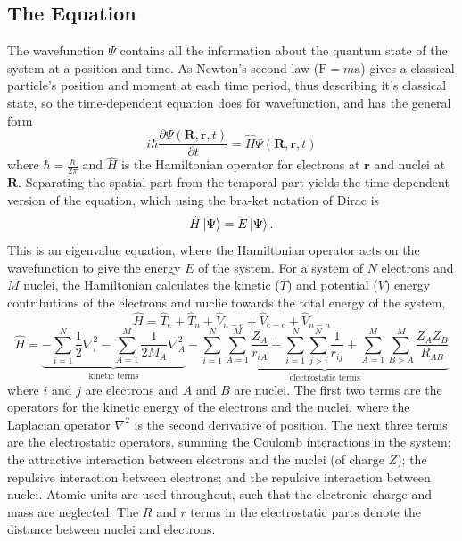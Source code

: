 \subsection{The \schro{} Equation}\label{section: QM_schrodinger}
The wavefunction $\Psi$ contains all the information about the quantum state of the system at a position and time. As Newton's second law ($\bm{\mathrm{F}}=m\bm{\mathrm{a}}$) gives a classical particle's position and moment at each time period, thus describing it's classical state, so the time-dependent \schro{} equation does for wavefunction, and has the general form
\begin{equation}\label{equation: td-schro}
    i\hbar{}\frac{\partial \Psi(\bm{R},\bm{r},t)}{\partial t}=\hat{H}\Psi(\bm{R},\bm{r},t)
\end{equation}
where $\hbar=\frac{h}{2\pi}$ and $\hat{H}$ is the Hamiltonian operator for electrons at $\bm{r}$ and nuclei at $\bm{R}$. Separating the spatial part from the temporal part yields the time-dependent version of the \schro{} equation, which using the bra-ket notation of Dirac is\cite{Schrodinger1926}
\begin{equation}\label{equation: ti-schro}
   \hat{H}\ket{\Psi}=E\ket{\Psi}.
\end{equation}
This is an eigenvalue equation, where the Hamiltonian operator acts on the wavefunction to give the energy $E$ of the system. For a system of $N$ electrons and $M$ nuclei, the Hamiltonian calculates the kinetic ($T$) and potential ($V$) energy contributions of the electrons and nuclie towards the total energy of the system,
\begin{equation}\label{equation: H-simple}
\hat{H}=\hat{T}_{e}+\hat{T}_{n}+\hat{V}_{n-e}+\hat{V}_{e-e}+\hat{V}_{n-n}
\end{equation}
\begin{equation}\label{equation: H}
   \hat{H}=\underbrace{-\sum_{i=1}^{N}\frac{1}{2}\nabla_{i}^2 - \sum_{A=1}^{M}\frac{1}{2M_{A}}\nabla_{A}^2}_\text{kinetic terms}-\underbrace{\sum_{i=1}^{N}\sum_{A=1}^{M}\frac{Z_{A}}{r_{iA}}+\sum_{i=1}^{N}\sum_{j>{i}}^{N}\frac{1}{r_{ij}}+\sum_{A=1}^{M}\sum_{B>{A}}^{M}\frac{Z_{A}Z_{B}}{R_{AB}}}_\text{electrostatic terms}
\end{equation}
where $i$ and $j$ are electrons and $A$ and $B$ are nuclei. The first two terms are the operators for the kinetic energy of the electrons and the nuclei, where the Laplacian operator $\nabla^{2}$ is the second derivative of position. The next three terms are the electrostatic operators, summing the Coulomb interactions in the system;  the attractive interaction between electrons and the nuclei (of charge $Z$); the repulsive interaction between electrons; and the repulsive interaction between nuclei. Atomic units are used throughout, such that the electronic charge and mass are neglected. The $R$ and $r$ terms in the electrostatic parts denote the distance between nuclei and electrons.

